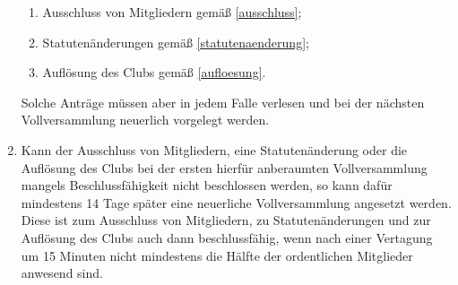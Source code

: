 \documentclass{statutclass}
\begin{document}
\begin{enumerate}
    \begin{enumerate}
        \item Ausschluss von Mitgliedern gemäß \ref{ausschluss};
        \item Statutenänderungen gemäß \ref{statutenaenderung};
        \item Auflösung des Clubs gemäß \ref{aufloesung}.
    \end{enumerate}
    Solche Anträge müssen aber in jedem Falle verlesen und bei der nächsten Vollversammlung neuerlich vorgelegt werden.
    \item\label{vertagung} Kann der Ausschluss von Mitgliedern, eine Statutenänderung oder die Auflösung des Clubs bei der ersten hierfür anberaumten Vollversammlung mangels Beschlussfähigkeit nicht beschlossen werden, so kann dafür mindestens 14 Tage später eine neuerliche Vollversammlung angesetzt werden. Diese ist zum Ausschluss von Mitgliedern, zu Statutenänderungen und zur Auflösung des Clubs auch dann beschlussfähig, wenn nach einer Vertagung um 15 Minuten nicht mindestens die Hälfte der ordentlichen Mitglieder anwesend sind. 
\end{enumerate}
\end{document}
